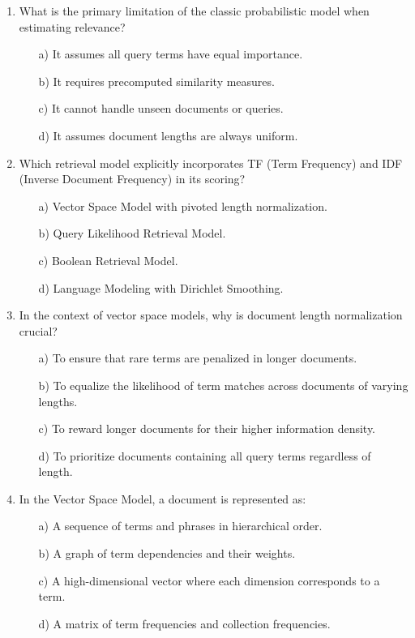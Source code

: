\documentclass[8pt]{extarticle}
\begin{document}
\begin{multicols}{2}
\begin{enumerate}
\item What is the primary limitation of the classic probabilistic model when estimating relevance?
\begin{itemize}
    \item[a)] It assumes all query terms have equal importance.
    \item[b)] It requires precomputed similarity measures.
    \item[c)] It cannot handle unseen documents or queries.
    \item[d)] It assumes document lengths are always uniform.
\end{itemize}

\item Which retrieval model explicitly incorporates TF (Term Frequency) and IDF (Inverse Document Frequency) in its scoring?
\begin{itemize}
    \item[a)] Vector Space Model with pivoted length normalization.
    \item[b)] Query Likelihood Retrieval Model.
    \item[c)] Boolean Retrieval Model.
    \item[d)] Language Modeling with Dirichlet Smoothing.
\end{itemize}

\item In the context of vector space models, why is document length normalization crucial?
\begin{itemize}
    \item[a)] To ensure that rare terms are penalized in longer documents.
    \item[b)] To equalize the likelihood of term matches across documents of varying lengths.
    \item[c)] To reward longer documents for their higher information density.
    \item[d)] To prioritize documents containing all query terms regardless of length.
\end{itemize}

\item In the Vector Space Model, a document is represented as:
\begin{itemize}
    \item[a)] A sequence of terms and phrases in hierarchical order.
    \item[b)] A graph of term dependencies and their weights.
    \item[c)] A high-dimensional vector where each dimension corresponds to a term.
    \item[d)] A matrix of term frequencies and collection frequencies.
\end{itemize}


\end{enumerate}
\end{multicols}
\end{document}
